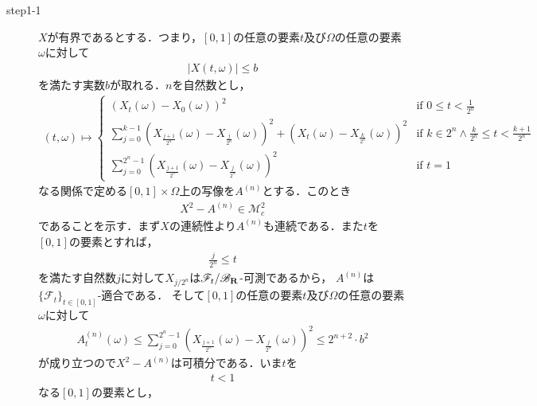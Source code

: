 	\begin{sketch}\mbox{}
		\begin{description}
			\item[step1-1] $X$が有界であるとする．つまり，$[0,1]$の任意の要素$t$及び$\Omega$の任意の要素$\omega$に対して
				\begin{align}
					|X(t,\omega)| \leq b
				\end{align}
				を満たす実数$b$が取れる．$n$を自然数とし，
				\begin{align}
					(t,\omega) \longmapsto 
					\begin{cases}
						\left( X_{t}(\omega) - X_{0}(\omega) \right)^{2} 
						&\mbox{if } {\displaystyle 0 \leq t < \frac{1}{2^{n}}} \\
						{\displaystyle \sum_{j=0}^{k-1} \left( X_{\frac{j+1}{2^{n}}}(\omega) - X_{\frac{j}{2^{n}}}(\omega) \right)^{2}
						+ \left( X_{t}(\omega) - X_{\frac{k}{2^{n}}}(\omega) \right)^{2}}
						&\mbox{if } {\displaystyle k \in 2^{n} \wedge \frac{k}{2^{n}} \leq t < \frac{k+1}{2^{n}}} \\
						{\displaystyle \sum_{j=0}^{2^{n}-1} \left( X_{\frac{j+1}{2^{n}}}(\omega) - X_{\frac{j}{2^{n}}}(\omega) \right)^{2}}
						&\mbox{if } t = 1
					\end{cases}
				\end{align}
				なる関係で定める$[0,1] \times \Omega$上の写像を$A^{(n)}$とする．このとき
				\begin{align}
					X^2 - A^{(n)} \in \mathscr{M}_{c}^{2}
					\label{fom:thm_decomposition_of_square_integrable_martingales_2}
				\end{align}
				であることを示す．まず$X$の連続性より$A^{(n)}$も連続である．また$t$を$[0,1]$の要素とすれば，
				\begin{align}
					\frac{j}{2^{n}} \leq t
				\end{align}
				を満たす自然数$j$に対して$X_{j/2^{n}}$は$\mathscr{F}_{t}/\mathscr{B}_{\mathbf{R}}$-可測であるから，
				$A^{(n)}$は$\{\mathscr{F}_t\}_{t \in [0,1]}$-適合である．
				そして$[0,1]$の任意の要素$t$及び$\Omega$の任意の要素$\omega$に対して
				\begin{align}
					A^{(n)}_{t}(\omega) 
					\leq \sum_{j=0}^{2^{n}-1} \left( X_{\frac{j+1}{2^{n}}}(\omega) - X_{\frac{j}{2^{n}}}(\omega) \right)^{2} 
					\leq 2^{n+2} \cdot b^{2}
				\end{align}
				が成り立つので$X^{2} - A^{(n)}$は可積分である．いま$t$を
				\begin{align}
					t < 1
				\end{align}
				なる$[0,1]$の要素とし，

\end{description}
\end{sketch}
